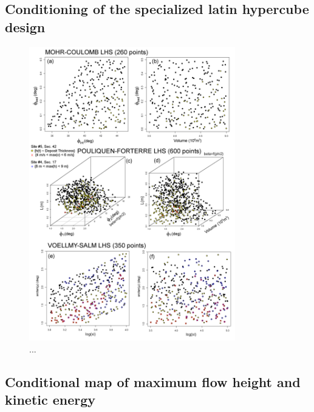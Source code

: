 \documentclass{article}
\begin{document}
\subsection{Conditioning of the specialized latin hypercube design}
\begin{figure}[H]
\centering
\includegraphics[width=0.8\textwidth]{Fig11.png}
\caption{...}
\label{Fig11}
\end{figure}

\subsection{Conditional map of maximum flow height and kinetic energy}
\end{document}
